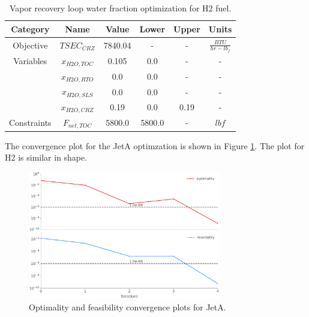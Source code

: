 \documentclass[12pt]{new-aiaa}
\begin{document}
\begin{table}[H]
    \centering
    \caption{Vapor recovery loop water fraction optimization for H2 fuel.}
    \begin{tabular}{|c|c|c|c|c|c|}
        \hline
        Category    & Name          & Value   & Lower  & Upper & Units                 \\
        \hline
        Objective   & $TSEC_{CRZ}$  & 7840.04 & -      & -     & $\frac{BTU}{hr-lb_f}$ \\
        \hline
        Variables   & $x_{H2O,TOC}$ & 0.105   & 0.0    & -     & -                     \\
                    & $x_{H2O,RTO}$ & 0.0     & 0.0    & -     & -                     \\
                    & $x_{H2O,SLS}$ & 0.0     & 0.0    & -     & -                     \\
                    & $x_{H2O,CRZ}$ & 0.19    & 0.0    & 0.19  & -                     \\
        \hline
        Constraints & $F_{net,TOC}$ & 5800.0  & 5800.0 & -     & $lbf$                 \\
        \hline
    \end{tabular}
    \label{tab_h2_opt}
\end{table}

\noindent
The convergence plot for the JetA optimzation is shown in Figure \ref{fig:conv_opt}. The plot for H2 is similar in shape.

\begin{figure}[!hbt]
    \centering
    \includegraphics[width=0.75\textwidth]{opt_summary.pdf}
    \caption{Optimality and feasibility convergence plots for JetA.}
    \label{fig:conv_opt}
\end{figure}
\end{document}
